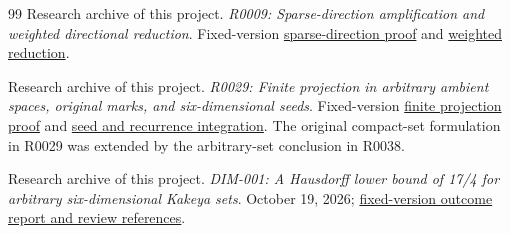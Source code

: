 \begin{thebibliography}{99}
Research archive of this project.
\emph{R0009: Sparse-direction amplification and weighted directional reduction}.
Fixed-version
\href{https://github.com/lixiang90/kakeya_research/blob/774c3614ec3e810c127c875a9f5abb60748be848/notes/40_multiscale/plank_inputs/R0009_sparse_direction_amplification.md}{sparse-direction proof} and
\href{https://github.com/lixiang90/kakeya_research/blob/774c3614ec3e810c127c875a9f5abb60748be848/notes/40_multiscale/plank_inputs/R0009_weighted_direction_reduction.md}{weighted reduction}.

Research archive of this project.
\emph{R0029: Finite projection in arbitrary ambient spaces, original marks, and six-dimensional seeds}.
Fixed-version
\href{https://github.com/lixiang90/kakeya_research/blob/774c3614ec3e810c127c875a9f5abb60748be848/notes/20_dimension_lifting/finite_seed_transfer/R0029_projection_and_prior_audit.md}{finite projection proof} and
\href{https://github.com/lixiang90/kakeya_research/blob/774c3614ec3e810c127c875a9f5abb60748be848/notes/20_dimension_lifting/finite_seed_transfer/R0029_conditional_seed_and_six_dimensional_bound.md}{seed and recurrence integration}.
The original compact-set formulation in R0029 was extended by the arbitrary-set conclusion in R0038.

Research archive of this project.
\emph{DIM-001: A Hausdorff lower bound of 17/4 for arbitrary six-dimensional Kakeya sets}.
October 19, 2026;
\href{https://github.com/lixiang90/kakeya_research/blob/774c3614ec3e810c127c875a9f5abb60748be848/results/reviewed/DIM-001_six_dimensional_Hausdorff_research_report.md}{fixed-version outcome report and review references}.
\end{thebibliography}

